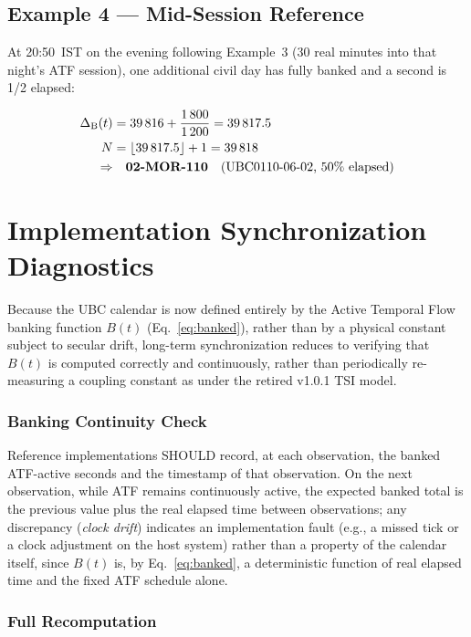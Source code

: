 \documentclass[journal,twoside]{IEEEtran}
\begin{document}
\subsection{Example 4 --- Mid-Session Reference}

At 20:50~IST on the evening following Example~3 (30 real minutes into that night's ATF
session), one additional civil day has fully banked and a second is 1/2 elapsed:

\begin{align}
\Delta_{\mathrm{B}}(t) &= 39\,816 + \frac{1\,800}{1\,200} = 39\,817.5 \notag \\
N &= \lfloor 39\,817.5 \rfloor + 1 = 39\,818 \notag \\
\Rightarrow & \quad \textbf{02-MOR-110} \quad (\text{UBC0110-06-02, 50\% elapsed})
\end{align}

\section{Implementation Synchronization Diagnostics}

Because the UBC calendar is now defined entirely by the Active Temporal Flow banking
function $B(t)$ (Eq.~\eqref{eq:banked}), rather than by a physical constant subject to
secular drift, long-term synchronization reduces to verifying that $B(t)$ is computed
correctly and continuously, rather than periodically re-measuring a coupling constant as
under the retired v1.0.1 TSI model.

\subsubsection{Banking Continuity Check}

Reference implementations SHOULD record, at each observation, the banked ATF-active
seconds and the timestamp of that observation. On the next observation, while ATF remains
continuously active, the expected banked total is the previous value plus the real elapsed
time between observations; any discrepancy (\emph{clock drift}) indicates an
implementation fault (e.g., a missed tick or a clock adjustment on the host system) rather
than a property of the calendar itself, since $B(t)$ is, by Eq.~\eqref{eq:banked}, a
deterministic function of real elapsed time and the fixed ATF schedule alone.

\subsubsection{Full Recomputation}
\end{document}
